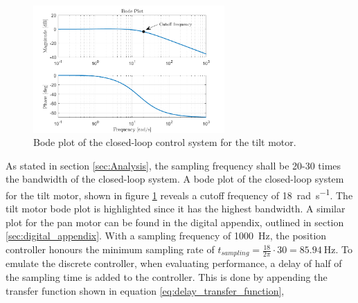 \documentclass[../../main.tex]{subfiles}
\begin{document}
\begin{figure}[h]
    \centering
    \includegraphics[width=0.65\textwidth]{Sections/System_Design/Images/Bode_TiltMotorPos.png}
    \caption{Bode plot of the closed-loop control system for the tilt motor.}
    \label{fig:pos_bode_plot}
\end{figure}

As stated in section \ref{sec:Analysis}, the sampling frequency shall be 20-30 times the bandwidth of the closed-loop system. A bode plot of the closed-loop system for the tilt motor, shown in figure \ref{fig:pos_bode_plot} reveals a cutoff frequency of \SI{18}{\radian \per \second}. The tilt motor bode plot is highlighted since it has the highest bandwidth. A similar plot for the pan motor can be found in the digital appendix, outlined in section \ref{sec:digital_appendix}. With a sampling frequency of \SI{1000}{\hertz}, the position controller honours the minimum sampling rate of $t_{sampling} = \frac{18}{2\pi}\cdot 30 = \SI{85.94}{\hertz}$. To emulate the discrete controller, when evaluating performance, a delay of half of the sampling time is added to the controller. This is done by appending the transfer function shown in equation \ref{eq:delay_transfer_function},

\end{document}
